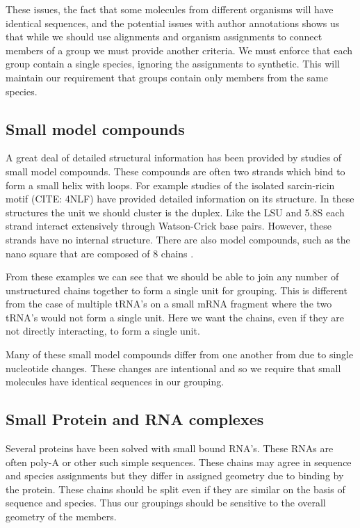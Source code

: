 These issues, the fact that some molecules from different organisms will have
identical sequences, and the potential issues with author annotations shows us
that while we should use alignments and organism assignments to connect members
of a group we must provide another criteria. We must enforce that each group
contain a single species, ignoring the assignments to synthetic. This will
maintain our requirement that groups contain only members from the same species.

\subsection{Small model compounds}

A great deal of detailed structural information has been provided by studies of
small model compounds. These compounds are often two strands which bind to form
a small helix with loops. For example studies of the isolated sarcin-ricin motif
(CITE: 4NLF) have provided detailed information on its structure. In these
structures the unit we should cluster is the duplex. Like the LSU and 5.8S each
strand interact extensively through Watson-Crick base pairs. However, these
strands have no internal structure. There are also model compounds, such as the
nano square that are composed of 8 chains \cite{Dibrov2011a}. 

From these examples we can see that we should be able to join any number of
unstructured chains together to form a single unit for grouping. This is
different from the case of multiple tRNA's on a small mRNA fragment where the
two tRNA's would not form a single unit. Here we want the chains, even if they
are not directly interacting, to form a single unit. 

Many of these small model compounds differ from one another from due to single
nucleotide changes. These changes are intentional and so we require that small
molecules have identical sequences in our grouping.

\subsection{Small Protein and RNA complexes}

Several proteins have been solved with small bound RNA's. These RNAs are often
poly-A or other such simple sequences. These chains may agree in sequence and
species assignments but they differ in assigned geometry due to binding by the
protein. These chains should be split even if they are similar on the basis of
sequence and species. Thus our groupings should be sensitive to the overall
geometry of the members.

